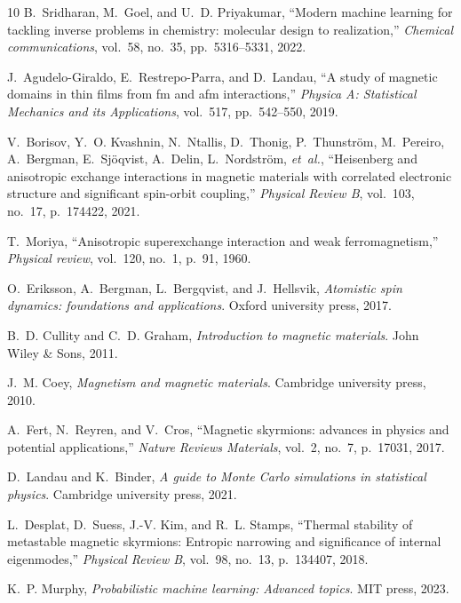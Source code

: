 \documentclass[final,5p,times,twocolumn]{elsarticle}
\begin{document}
\begin{thebibliography}{10}
B.~Sridharan, M.~Goel, and U.~D. Priyakumar, ``Modern machine learning for tackling inverse problems in chemistry: molecular design to realization,'' {\em Chemical communications}, vol.~58, no.~35, pp.~5316--5331, 2022.

J.~Agudelo-Giraldo, E.~Restrepo-Parra, and D.~Landau, ``A study of magnetic domains in thin films from fm and afm interactions,'' {\em Physica A: Statistical Mechanics and its Applications}, vol.~517, pp.~542--550, 2019.

V.~Borisov, Y.~O. Kvashnin, N.~Ntallis, D.~Thonig, P.~Thunstr{\"o}m, M.~Pereiro, A.~Bergman, E.~Sj{\"o}qvist, A.~Delin, L.~Nordstr{\"o}m, {\em et~al.}, ``Heisenberg and anisotropic exchange interactions in magnetic materials with correlated electronic structure and significant spin-orbit coupling,'' {\em Physical Review B}, vol.~103, no.~17, p.~174422, 2021.

T.~Moriya, ``Anisotropic superexchange interaction and weak ferromagnetism,'' {\em Physical review}, vol.~120, no.~1, p.~91, 1960.

O.~Eriksson, A.~Bergman, L.~Bergqvist, and J.~Hellsvik, {\em Atomistic spin dynamics: foundations and applications}.
\newblock Oxford university press, 2017.

B.~D. Cullity and C.~D. Graham, {\em Introduction to magnetic materials}.
\newblock John Wiley \& Sons, 2011.

J.~M. Coey, {\em Magnetism and magnetic materials}.
\newblock Cambridge university press, 2010.

A.~Fert, N.~Reyren, and V.~Cros, ``Magnetic skyrmions: advances in physics and potential applications,'' {\em Nature Reviews Materials}, vol.~2, no.~7, p.~17031, 2017.

D.~Landau and K.~Binder, {\em A guide to Monte Carlo simulations in statistical physics}.
\newblock Cambridge university press, 2021.

L.~Desplat, D.~Suess, J.-V. Kim, and R.~L. Stamps, ``Thermal stability of metastable magnetic skyrmions: Entropic narrowing and significance of internal eigenmodes,'' {\em Physical Review B}, vol.~98, no.~13, p.~134407, 2018.

K.~P. Murphy, {\em Probabilistic machine learning: Advanced topics}.
\newblock MIT press, 2023.


\end{thebibliography}
\end{document}
